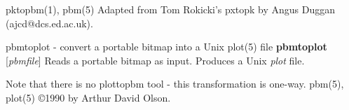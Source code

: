 pktopbm(1), pbm(5)
Adapted from Tom Rokicki's pxtopk by Angus Duggan (ajcd@dcs.ed.ac.uk).

%
 
%

\newpage
%

pbmtoplot - convert a portable bitmap into a Unix plot(5) file
{\bf pbmtoplot}
{\rm [}{\it pbmfile}{\rm ]}
Reads a portable bitmap as input.
Produces a Unix
{\it plot}
file.
\par
Note that there is no plottopbm tool - this transformation is one-way.
pbm(5), plot(5)
\copyright 1990 by Arthur David Olson.
%
 
%

\newpage
%

